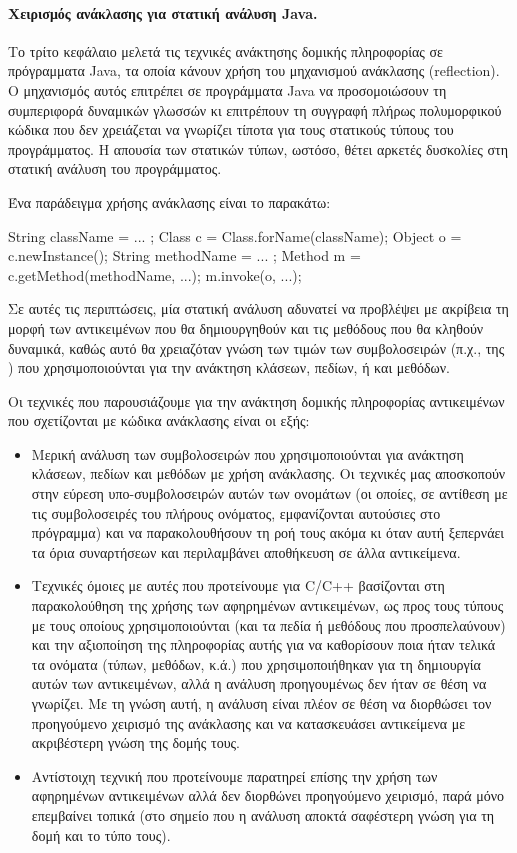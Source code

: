 \paragraph*{Χειρισμός ανάκλασης για στατική ανάλυση {\en Java}.}
Το τρίτο κεφάλαιο μελετά τις τεχνικές ανάκτησης δομικής πληροφορίας σε
πρόγραμματα {\en Java}, τα οποία κάνουν χρήση του μηχανισμού ανάκλασης
({\en reflection}).  Ο μηχανισμός αυτός επιτρέπει σε προγράμματα {\en
  Java} να προσομοιώσουν τη συμπεριφορά δυναμικών γλωσσών κι
επιτρέπουν τη συγγραφή πλήρως πολυμορφικού κώδικα που δεν χρειάζεται
να γνωρίζει τίποτα για τους στατικούς τύπους του προγράμματος. Η
απουσία των στατικών τύπων, ωστόσο, θέτει αρκετές δυσκολίες στη
στατική ανάλυση του προγράμματος.

Ένα παράδειγμα χρήσης ανάκλασης είναι το παρακάτω:
{\en
  \begin{javacodelinum}
    String className = ... ;
    Class c = Class.forName(className);
    Object o = c.newInstance();
    String methodName = ... ;
    Method m = c.getMethod(methodName, ...);
    m.invoke(o, ...);
  \end{javacodelinum}
}

Σε αυτές τις περιπτώσεις, μία στατική ανάλυση αδυνατεί να προβλέψει με
ακρίβεια τη μορφή των αντικειμένων που θα δημιουργηθούν και τις μεθόδους
που θα κληθούν δυναμικά, καθώς αυτό θα χρειαζόταν γνώση των τιμών των
συμβολοσειρών (π.χ., της {\en {}}) που χρησιμοποιούνται
για την ανάκτηση κλάσεων, πεδίων, ή και μεθόδων.

Οι τεχνικές που παρουσιάζουμε για την ανάκτηση δομικής πληροφορίας
αντικειμένων που σχετίζονται με κώδικα ανάκλασης είναι οι εξής:
\begin{itemize}
\item Μερική ανάλυση των συμβολοσειρών που χρησιμοποιούνται για
  ανάκτηση κλάσεων, πεδίων και μεθόδων με χρήση ανάκλασης. Οι τεχνικές
  μας αποσκοπούν στην εύρεση υπο-συμβολοσειρών αυτών των ονομάτων (οι
  οποίες, σε αντίθεση με τις συμβολοσειρές του πλήρους ονόματος,
  εμφανίζονται αυτούσιες στο πρόγραμμα) και να παρακολουθήσουν τη ροή
  τους ακόμα κι όταν αυτή ξεπερνάει τα όρια συναρτήσεων και
  περιλαμβάνει αποθήκευση σε άλλα αντικείμενα.
\item Τεχνικές όμοιες με αυτές που προτείνουμε για {\en C/C++}
  βασίζονται στη παρακολούθηση της χρήσης των αφηρημένων αντικειμένων,
  ως προς τους τύπους με τους οποίους χρησιμοποιούνται (και τα πεδία ή
  μεθόδους που προσπελαύνουν) και την αξιοποίηση της πληροφορίας αυτής
  για να καθορίσουν ποια ήταν τελικά τα ονόματα (τύπων, μεθόδων, κ.ά.)
  που χρησιμοποιήθηκαν για τη δημιουργία αυτών των αντικειμένων, αλλά
  η ανάλυση προηγουμένως δεν ήταν σε θέση να γνωρίζει. Με τη γνώση
  αυτή, η ανάλυση είναι πλέον σε θέση να διορθώσει τον προηγούμενο
  χειρισμό της ανάκλασης και να κατασκευάσει αντικείμενα με
  ακριβέστερη γνώση της δομής τους.
\item Αντίστοιχη τεχνική που προτείνουμε παρατηρεί επίσης την χρήση
  των αφηρημένων αντικειμένων αλλά δεν διορθώνει προηγούμενο χειρισμό,
  παρά μόνο επεμβαίνει τοπικά (στο σημείο που η ανάλυση αποκτά
  σαφέστερη γνώση για τη δομή και το τύπο τους).
\end{itemize}

